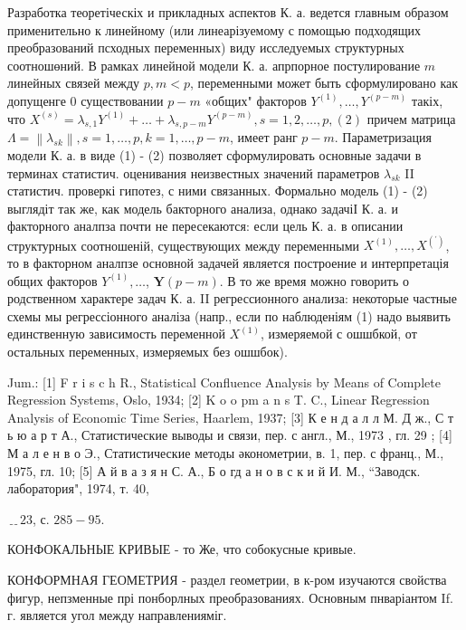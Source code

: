 \documentclass[10pt]{article}
\begin{document}
Разработка теоретіческіх и прикладных аспектов К. а. ведется главным образом применительно к линейному (или линеарізуемому с помощью подходящих преобразований псходных переменных) виду исследуемых структурных соотношөний. В рамках линейной модели К. а. апрпорное постулирование $m$ линейных связей между $p, m<p$, переменными может быть сформулировано как допущенге 0 существовании $p-m$ «общих" факторов $Y^{(1)}, \ldots, Y^{(p-m)}$ такіх, что $X^{(s)}=\lambda_{s, 1} Y^{(1)}+\ldots+\lambda_{s, p-m} Y^{(p-m)}, s=1,2, \ldots, p,(2)$ причем матрица $\Lambda=\left\|\lambda_{s k}\right\|, s=1, \ldots, p, k=1, \ldots, p-m$, имеет ранг $p-m$. Параметризация модели $К$. а. в виде (1) - (2) позволяет сформулировать основные задачи в терминах статистич. оценивания неизвестных значений параметров $\lambda_{s k}$ II статистич. проверкі гипотез, с ними связанных. Формально модель (1) - (2) выглядіт так же, как модель бакторного анализа, однако задачіІ К. а. и факторного аналпза почти не пересекаются: если цель К. а. в описании структурных соотношеній, существующих между переменными $X^{(1)}, \ldots, X^{\left({ }^{\prime}\right)}$, то в факторном аналпзе основной задачей является построение и интерпретація общих факторов $Y^{(1)}, \ldots$, $\boldsymbol{Y}(p-m)$. В то же время можно говорить о родственном характере задач К. а. II регрессионного анализа: некоторые частные схемы мы регрессіонного аналіза (напр., если по наблюденіям (1) надо выявить единственную зависимость переменной $X^{(1)}$, измеряемой с ошшбкой, от остальных переменных, измеряемых без ошшбок).



Jum.: [1] F r i s c h R., Statistical Confluence Analysis by Means of Complete Regression Systems, Oslo, 1934; [2] K o o pm a n s T. C., Linear Regression Analysis of Economic Time Series, Haarlem, 1937; [3] К е н д а л л М. Д ж., С т ь ю а р т А., Статистические выводы и связи, пер. с англ., М., 1973 , гл. 29 ; [4] М а л е н в о Э., Статистические методы әконометрии, в. 1, пер. с франц., М., 1975, гл. 10; [5] А й в а з я н С. А., Б о гд а н о в с к и й И. М., “Заводск. лаборатория", 1974, т. 40,

$﹎{2} 3$, с. $285-95$.



КОНФОКАЛЬНЫЕ КРИВЫЕ - то Же, что собокусные кривые.



КОНФОРМНАЯ ГЕОМЕТРИЯ - раздел геометрии, в к-ром изучаются свойства фигур, непзменные прі понборлных преобразованиях. Основным пнваріантом If. г. является угол между направленияміг.
\end{document}
